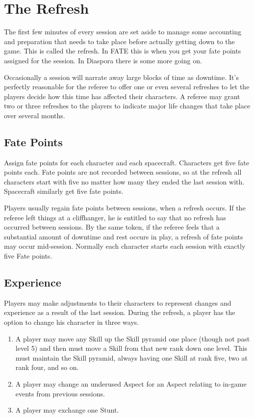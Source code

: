 \section{The Refresh}
\label{sec:the-refresh}

The first few minutes of every session are set aside to manage some accounting and preparation that needs to take place before actually getting down to the game. This is called the refresh. In FATE this is when you get your fate points assigned for the session. In Diaspora there is some more going on.

Occasionally a session will narrate away large blocks of time as downtime. It's perfectly reasonable for the referee to offer one or even several refreshes to let the players decide how this time has affected their characters. A referee may grant two or three refreshes to the players to indicate major life changes that take place over several months.

\subsection{Fate Points}
\label{sec:Fate Points}

Assign fate points for each character and each spacecraft. Characters get five fate points each. Fate points are not recorded between sessions, so at the refresh all characters start with five no matter how many they ended the last session with. Spacecraft similarly get five fate points.

Players usually regain fate points between sessions, when a refresh occurs. If the referee left things at a cliffhanger, he is entitled to say that no refresh has occurred between sessions. By the same token, if the referee feels that a substantial amount of downtime and rest occurs in play, a refresh of fate points may occur mid-session. Normally each character starts each session with exactly five Fate points.

\subsection{Experience}
\label{sec:Experience}

Players may make adjustments to their characters to represent changes and experience as a result of the last session. During the refresh, a player has the option to change his character in three ways.

\begin{enumerate}
\item A player may move any Skill up the Skill pyramid one place (though not past level 5) and then must move a Skill from that new rank down one level. This must maintain the Skill pyramid, always having one Skill at rank five, two at rank four, and so on.

\item A player may change an underused Aspect for an Aspect relating to in-game events from previous sessions.

\item A player may exchange one Stunt.
\end{enumerate}

